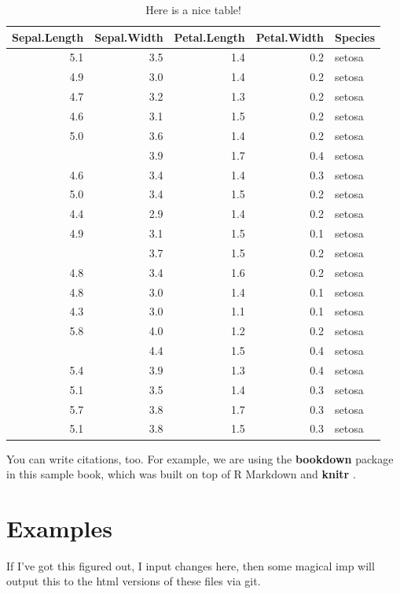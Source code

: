 \documentclass[
]{book}
\begin{document}
\begin{table}

\caption{\label{tab:nice-tab}Here is a nice table!}
\centering
\begin{tabular}[t]{rrrrl}
\toprule
Sepal.Length & Sepal.Width & Petal.Length & Petal.Width & Species\\
\midrule
5.1 & 3.5 & 1.4 & 0.2 & setosa\\
4.9 & 3.0 & 1.4 & 0.2 & setosa\\
4.7 & 3.2 & 1.3 & 0.2 & setosa\\
4.6 & 3.1 & 1.5 & 0.2 & setosa\\
5.0 & 3.6 & 1.4 & 0.2 & setosa\\
\addlinespace
5.4 & 3.9 & 1.7 & 0.4 & setosa\\
4.6 & 3.4 & 1.4 & 0.3 & setosa\\
5.0 & 3.4 & 1.5 & 0.2 & setosa\\
4.4 & 2.9 & 1.4 & 0.2 & setosa\\
4.9 & 3.1 & 1.5 & 0.1 & setosa\\
\addlinespace
5.4 & 3.7 & 1.5 & 0.2 & setosa\\
4.8 & 3.4 & 1.6 & 0.2 & setosa\\
4.8 & 3.0 & 1.4 & 0.1 & setosa\\
4.3 & 3.0 & 1.1 & 0.1 & setosa\\
5.8 & 4.0 & 1.2 & 0.2 & setosa\\
\addlinespace
5.7 & 4.4 & 1.5 & 0.4 & setosa\\
5.4 & 3.9 & 1.3 & 0.4 & setosa\\
5.1 & 3.5 & 1.4 & 0.3 & setosa\\
5.7 & 3.8 & 1.7 & 0.3 & setosa\\
5.1 & 3.8 & 1.5 & 0.3 & setosa\\
\bottomrule
\end{tabular}
\end{table}

You can write citations, too. For example, we are using the \textbf{bookdown} package \citep{R-bookdown} in this sample book, which was built on top of R Markdown and \textbf{knitr} \citep{xie2015}.

\hypertarget{examples}{%
\chapter{Examples}\label{examples}}

If I've got this figured out, I input changes here, then some magical imp will output this to the html versions of these files via git.
\end{document}
